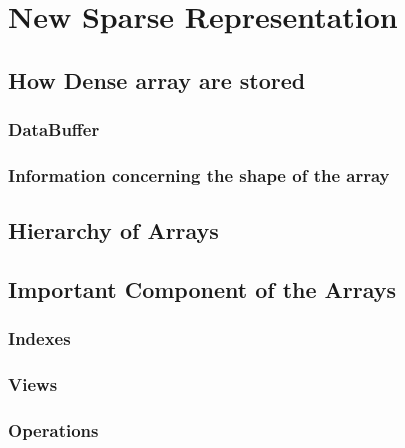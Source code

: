 \chapter{New Sparse Representation}
\section{How Dense array are stored}
\subsection{DataBuffer}
\subsection{Information concerning the shape of the array}

\section{Hierarchy of Arrays}
\section{Important Component of the Arrays}
\subsection{Indexes}
\subsection{Views}
\subsection{Operations}
